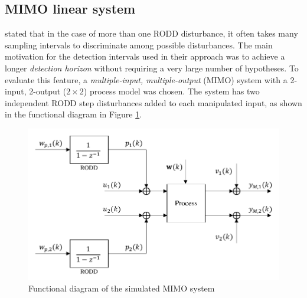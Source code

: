 \subsection{MIMO linear system} \label{sim-obs-lin-2}

\cite{robertson_method_1998} stated that in the case of more than one RODD disturbance, it often takes many sampling intervals to discriminate among possible disturbances. The main motivation for the detection intervals used in their approach was to achieve a longer \textit{detection horizon} without requiring a very large number of hypotheses. To evaluate this feature, a \textit{multiple-input, multiple-output} (MIMO) system with a 2-input, 2-output ($2\times2$) process model was chosen. The system has two independent \gls{RODD} step disturbances added to each manipulated input, as shown in the functional diagram in Figure \ref{fig:sim-sys-diag-2x2}. 
\begin{figure}[htp]
	\centering
	\includegraphics[width=11.5cm]{images/sim-sys-diag-2x2.pdf}
	\caption{Functional diagram of the simulated MIMO system}
	\label{fig:sim-sys-diag-2x2}
\end{figure}

